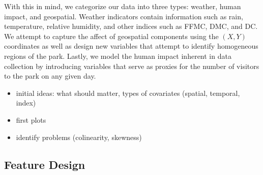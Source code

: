 \documentclass{article}
\begin{document}
With this in mind, we categorize our data into three types: weather, human impact, and geospatial. Weather indicators contain information such as rain, temperature, relative humidity, and other indices such as FFMC, DMC, and DC. We attempt to capture the affect of geospatial components using the $(X,Y)$ coordinates as well as design new variables that attempt to identify homogeneous regions of the park. Lastly, we model the human impact inherent in data collection by introducing variables that serve as proxies for the number of visitors to the park on any given day. 




\begin{itemize}
\item initial ideas: what should matter, types of covariates (spatial, temporal, index)
\item first plots
\item identify problems (colinearity, skewness)
\end{itemize}

\subsection{Feature Design}\label{Engineering}
\end{document}
